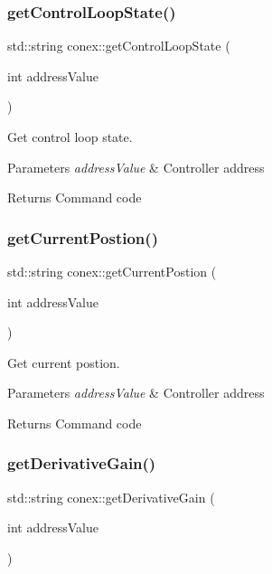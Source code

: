 \subsubsection{\texorpdfstring{get\+Control\+Loop\+State()}{getControlLoopState()}}
{\footnotesize\ttfamily std\+::string conex\+::get\+Control\+Loop\+State (\begin{DoxyParamCaption}\item[{int}]{address\+Value }\end{DoxyParamCaption})}



Get control loop state. 


\begin{DoxyParams}{Parameters}
{\em address\+Value} & Controller address \\
\hline
\end{DoxyParams}
\begin{DoxyReturn}{Returns}
Command code 
\end{DoxyReturn}
\mbox{\label{namespaceconex_abc96926292153eb7b8268a340eb140fc}} 
\subsubsection{\texorpdfstring{get\+Current\+Postion()}{getCurrentPostion()}}
{\footnotesize\ttfamily std\+::string conex\+::get\+Current\+Postion (\begin{DoxyParamCaption}\item[{int}]{address\+Value }\end{DoxyParamCaption})}



Get current postion. 


\begin{DoxyParams}{Parameters}
{\em address\+Value} & Controller address \\
\hline
\end{DoxyParams}
\begin{DoxyReturn}{Returns}
Command code 
\end{DoxyReturn}
\mbox{\label{namespaceconex_a30cba542f0ebd8eea74032431fb29d21}} 
\subsubsection{\texorpdfstring{get\+Derivative\+Gain()}{getDerivativeGain()}}
{\footnotesize\ttfamily std\+::string conex\+::get\+Derivative\+Gain (\begin{DoxyParamCaption}\item[{int}]{address\+Value }\end{DoxyParamCaption})}



